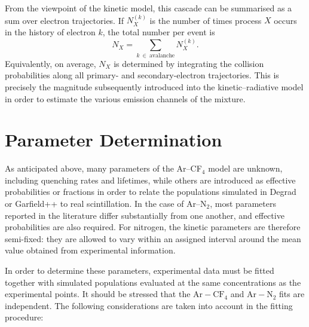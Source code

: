 \documentclass[12pt,a4paper]{article}
\newcommand{\N}{\mathrm{N}}
\newcommand{\Ar}{\mathrm{Ar}}
\newcommand{\CF}{\mathrm{CF}}
\begin{document}

From the viewpoint of the kinetic model, this cascade can be summarised as a sum over electron trajectories. If $N_X^{(k)}$ is the number of times process $X$ occurs in the history of electron $k$, the total number per event is
\begin{equation}
    N_X = \sum_{k \ \in \ \mathrm{avalanche}} N_X^{(k)}.
    \label{eq:NX_event}
\end{equation}
Equivalently, on average, $N_X$ is determined by integrating the collision probabilities along all primary- and secondary-electron trajectories. This is precisely the magnitude subsequently introduced into the kinetic--radiative model in order to estimate the various emission channels of the mixture.

\section{Parameter Determination}

As anticipated above, many parameters of the Ar--CF$_4$ model are unknown, including quenching rates and lifetimes, while others are introduced as effective probabilities or fractions in order to relate the populations simulated in Degrad or Garfield++ to real scintillation. In the case of Ar--N$_2$, most parameters reported in the literature differ substantially from one another, and effective probabilities are also required. For nitrogen, the kinetic parameters are therefore semi-fixed: they are allowed to vary within an assigned interval around the mean value obtained from experimental information.

In order to determine these parameters, experimental data must be fitted together with simulated populations evaluated at the same concentrations as the experimental points. It should be stressed that the $\Ar-\CF_4$ and $\Ar-\N_2$ fits are independent. The following considerations are taken into account in the fitting procedure:
\end{document}
